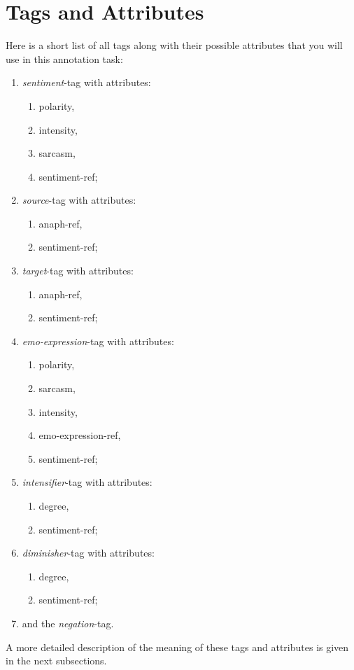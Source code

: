 \documentclass[11pt,a4paper]{article}
\begin{document}

\section{Tags and Attributes}
Here is a short list of all tags along with their possible attributes
that you will use in this annotation task:
\begin{enumerate}
\item \textit{sentiment}-tag with attributes:
  \begin{enumerate}
  \item polarity,
  \item intensity,
  \item sarcasm,
  \item sentiment-ref;
  \end{enumerate}
\item \textit{source}-tag with attributes:
  \begin{enumerate}
  \item anaph-ref,
  \item sentiment-ref;
  \end{enumerate}
\item \textit{target}-tag with attributes:
  \begin{enumerate}
  \item anaph-ref,
  \item sentiment-ref;
  \end{enumerate}
\item \textit{emo-expression}-tag with attributes:
  \begin{enumerate}
  \item polarity,
  \item sarcasm,
  \item intensity,
  \item emo-expression-ref,
  \item sentiment-ref;
  \end{enumerate}
\item \textit{intensifier}-tag with attributes:
  \begin{enumerate}
  \item degree,
  \item sentiment-ref;
  \end{enumerate}
\item \textit{diminisher}-tag with attributes:
  \begin{enumerate}
  \item degree,
  \item sentiment-ref;
  \end{enumerate}
\item and the \textit{negation}-tag.
\end{enumerate}
A more detailed description of the meaning of these tags and
attributes is given in the next subsections.
\end{document}
